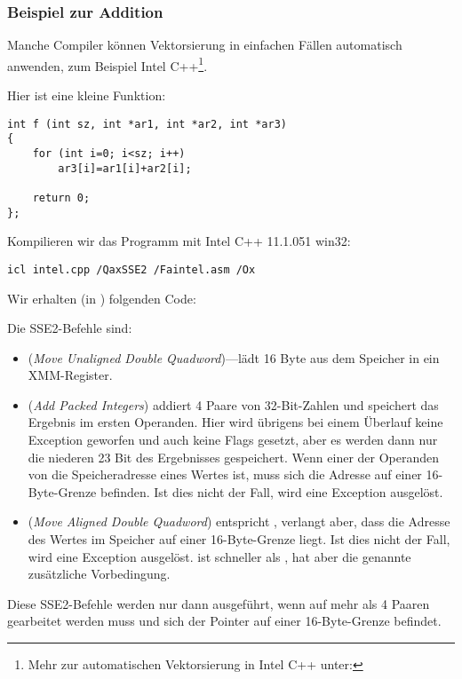 \subsubsection{Beispiel zur Addition}

Manche Compiler können Vektorsierung in einfachen Fällen automatisch anwenden, zum Beispiel Intel C++\footnote{Mehr zur
automatischen Vektorsierung in Intel C++ unter:\URLINTELVEC}.

Hier ist eine kleine Funktion:

\begin{lstlisting}[style=customc]
int f (int sz, int *ar1, int *ar2, int *ar3)
{
	for (int i=0; i<sz; i++)
		ar3[i]=ar1[i]+ar2[i];

	return 0;
};
\end{lstlisting}


Kompilieren wir das Programm mit Intel C++ 11.1.051 win32:

\begin{verbatim}
icl intel.cpp /QaxSSE2 /Faintel.asm /Ox
\end{verbatim}

Wir erhalten (in \IDA) folgenden Code:



Die SSE2-Befehle sind:
\begin{itemize}
\item
\MOVDQU (\emph{Move Unaligned Double Quadword})---lädt 16 Byte aus dem Speicher in ein XMM-Register.

\item
\PADDD (\emph{Add Packed Integers}) addiert 4 Paare von 32-Bit-Zahlen und speichert das Ergebnis im ersten Operanden.
Hier wird übrigens bei einem Überlauf keine Exception geworfen und auch keine Flags gesetzt, aber es werden dann nur die
niederen 23 Bit des Ergebnisses gespeichert.
Wenn einer der Operanden von \PADDD die Speicheradresse eines Wertes ist, muss sich die Adresse auf einer 16-Byte-Grenze
befinden. Ist dies nicht der Fall, wird eine Exception ausgelöst.

\item
\MOVDQA (\emph{Move Aligned Double Quadword}) entspricht \MOVDQU, verlangt aber, dass die Adresse des Wertes im Speicher
auf einer 16-Byte-Grenze liegt. Ist dies nicht der Fall, wird eine Exception ausgelöst. \MOVDQA ist schneller als
\MOVDQU, hat aber die genannte zusätzliche Vorbedingung.

\end{itemize}
Diese SSE2-Befehle werden nur dann ausgeführt, wenn auf mehr als 4 Paaren gearbeitet werden muss und sich der Pointer
 auf einer 16-Byte-Grenze befindet.

